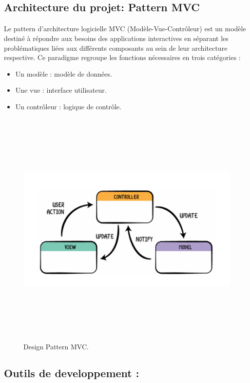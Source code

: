 \documentclass{article}
\begin{document}
{\subsection{Architecture du projet: Pattern MVC}
\onehalfspacing\paragraph{}{Le pattern d'architecture logicielle MVC (Modèle-Vue-Contrôleur) est un modèle destiné à répondre aux
besoins des applications interactives en séparant les problématiques liées aux différents composants au sein de
leur architecture respective. Ce paradigme regroupe les fonctions nécessaires en trois catégories :
}
\vspace{0.5cm}
\begin{itemize}[label=\textbullet]
        \item Un modèle : modèle de données.
        \item Une vue : interface utilisateur.
        \item Un contrôleur : logique de contrôle.
\end{itemize}
\begin{figure}[H]
    \centering
    \includegraphics[width=17cm,height=12cm]{mvc.PNG}
    \caption{Design Pattern MVC.}
    \label{fig:Design Pattern MVC.}
\end{figure}
\subsection{Outils de developpement :}
}
\end{document}
